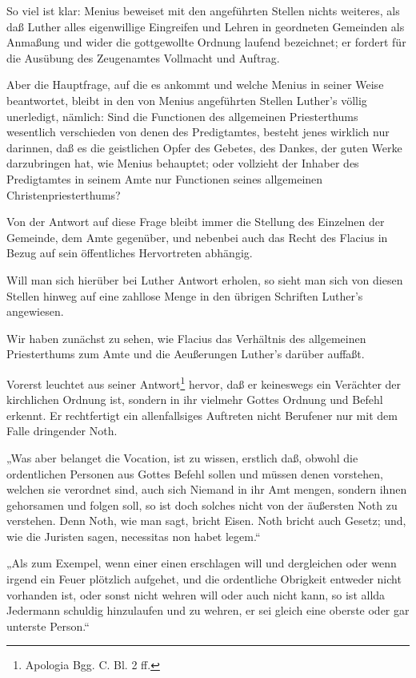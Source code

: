 So viel ist klar: Menius beweiset mit den angeführten Stellen nichts weiteres, als daß Luther alles eigenwillige
Eingreifen und Lehren in geordneten Gemeinden als Anmaßung und wider die gottgewollte Ordnung laufend
bezeichnet; er fordert für die Ausübung des Zeugenamtes Vollmacht und Auftrag.

Aber die Hauptfrage, auf die es ankommt und welche Menius in seiner Weise beantwortet, bleibt in den von Menius
angeführten Stellen Luther’s völlig unerledigt, nämlich: Sind die Functionen des allgemeinen Priesterthums
wesentlich verschieden von denen des Predigtamtes, besteht jenes wirklich nur darinnen, daß es die geistlichen
Opfer des Gebetes, des Dankes, der guten Werke darzubringen hat, wie Menius behauptet; oder vollzieht der Inhaber
des Predigtamtes in seinem Amte nur Functionen seines allgemeinen Christenpriesterthums?

Von der Antwort auf diese Frage bleibt immer die Stellung des Einzelnen der Gemeinde, dem Amte gegenüber, und
nebenbei auch das Recht des Flacius in Bezug auf sein öffentliches Hervortreten abhängig.

Will man sich hierüber bei Luther Antwort erholen, so sieht man sich von diesen Stellen hinweg auf eine zahllose
Menge in den übrigen Schriften Luther’s angewiesen.

Wir haben zunächst zu sehen, wie Flacius das Verhältnis des allgemeinen Priesterthums zum Amte und die Aeußerungen
Luther’s darüber auffaßt.

Vorerst leuchtet aus seiner Antwort\footnote{Apologia Bgg. C. Bl. 2 ff.} hervor, daß er keineswegs ein Verächter der kirchlichen Ordnung ist,
sondern in ihr vielmehr Gottes Ordnung und Befehl erkennt. Er rechtfertigt ein allenfallsiges Auftreten nicht
Berufener nur mit dem Falle dringender Noth.

„Was aber belanget die Vocation, ist zu wissen, erstlich daß, obwohl die ordentlichen Personen aus Gottes
Befehl sollen und müssen denen vorstehen, welchen sie verordnet sind, auch sich Niemand in ihr Amt mengen,
sondern ihnen gehorsamen und folgen soll, so ist doch solches nicht von der äußersten Noth zu verstehen. Denn
Noth, wie man sagt, bricht Eisen. Noth bricht auch Gesetz; und, wie die Juristen sagen, necessitas non habet legem.“

„Als zum Exempel, wenn einer einen erschlagen will und dergleichen oder wenn irgend ein Feuer plötzlich aufgehet,
und die ordentliche Obrigkeit entweder nicht vorhanden ist, oder sonst nicht wehren will oder auch nicht kann,
so ist allda Jedermann schuldig hinzulaufen und zu wehren, er sei gleich eine oberste oder gar unterste Person.“

